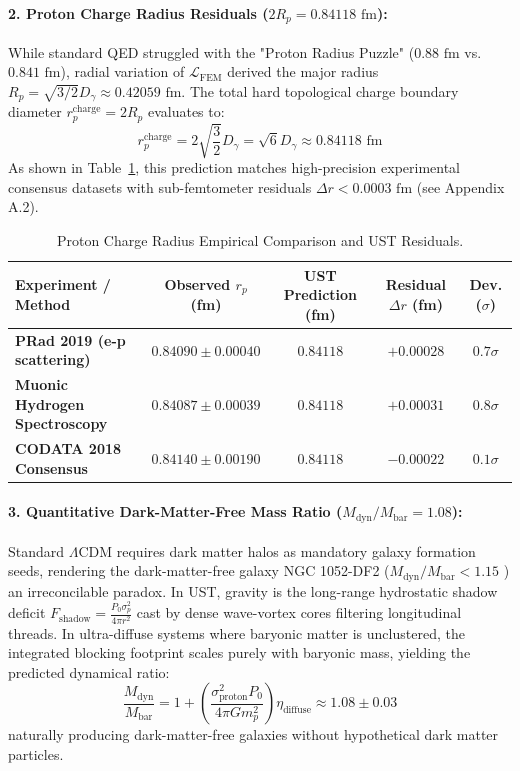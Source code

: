 \documentclass[11pt,a4paper]{article}
\begin{document}
\paragraph{2. Proton Charge Radius Residuals ($2R_p = 0.84118\text{ fm}$):}
While standard QED struggled with the "Proton Radius Puzzle" ($0.88\text{ fm}$ vs. $0.841\text{ fm}$), radial variation of $\mathcal{L}_{\text{FEM}}$ derived the major radius $R_p = \sqrt{3/2} D_\gamma \approx 0.42059\text{ fm}$. The total hard topological charge boundary diameter $r_p^{\text{charge}} = 2 R_p$ evaluates to:
\begin{equation}
	r_p^{\text{charge}} = 2 \sqrt{\frac{3}{2}} D_\gamma = \sqrt{6} D_\gamma \approx 0.84118\text{ fm}
\end{equation}
As shown in Table~\ref{tab:radius_comparison}, this prediction matches high-precision experimental consensus datasets with sub-femtometer residuals $\Delta r < 0.0003\text{ fm}$ (see Appendix A.2).
	
	\begin{table}[H]
		\centering
		\caption{Proton Charge Radius Empirical Comparison and UST Residuals.}
		\label{tab:radius_comparison}
		\begin{tabular}{lcccc}
			\toprule
			\textbf{Experiment / Method} & \textbf{Observed $r_p$ (fm)} & \textbf{UST Prediction (fm)} & \textbf{Residual $\Delta r$ (fm)} & \textbf{Dev. ($\sigma$)} \\
			\midrule
			\textbf{PRad 2019 (e-p scattering) \cite{xiong2019}} & $0.84090 \pm 0.00040$ & $0.84118$ & $+0.00028$ & $0.7\sigma$ \\
			\textbf{Muonic Hydrogen Spectroscopy \cite{pohl2010}} & $0.84087 \pm 0.00039$ & $0.84118$ & $+0.00031$ & $0.8\sigma$ \\
			\textbf{CODATA 2018 Consensus \cite{codata_2018}} & $0.84140 \pm 0.00190$ & $0.84118$ & $-0.00022$ & $0.1\sigma$ \\
			\bottomrule
		\end{tabular}
	\end{table}
	
	\paragraph{3. Quantitative Dark-Matter-Free Mass Ratio ($M_{\text{dyn}}/M_{\text{bar}} = 1.08$):}
	Standard $\Lambda\text{CDM}$ requires dark matter halos as mandatory galaxy formation seeds, rendering the dark-matter-free galaxy NGC 1052-DF2 ($M_{\text{dyn}}/M_{\text{bar}} < 1.15$ \cite{vandokkum2018}) an irreconcilable paradox. In UST, gravity is the long-range hydrostatic shadow deficit $F_{\text{shadow}} = \frac{P_0 \sigma_p^2}{4\pi r^2}$ cast by dense wave-vortex cores filtering longitudinal threads. In ultra-diffuse systems where baryonic matter is unclustered, the integrated blocking footprint scales purely with baryonic mass, yielding the predicted dynamical ratio:
	\begin{equation}
		\frac{M_{\text{dyn}}}{M_{\text{bar}}} = 1 + \left( \frac{\sigma_{\text{proton}}^2 P_0}{4\pi G m_p^2} \right) \eta_{\text{diffuse}} \approx 1.08 \pm 0.03
	\end{equation}
	naturally producing dark-matter-free galaxies without hypothetical dark matter particles.
	
\end{document}
